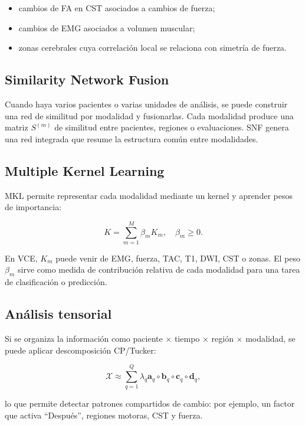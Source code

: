 \documentclass[conference]{IEEEtran}
\begin{document}
\begin{itemize}[leftmargin=*]
    \item cambios de FA en CST asociados a cambios de fuerza;
    \item cambios de EMG asociados a volumen muscular;
    \item zonas cerebrales cuya correlación local se relaciona con simetría de fuerza.
\end{itemize}

\subsection{Similarity Network Fusion}
Cuando haya varios pacientes o varias unidades de análisis, se puede construir una red de similitud por modalidad y fusionarlas. Cada modalidad produce una matriz $S^{(m)}$ de similitud entre pacientes, regiones o evaluaciones. SNF genera una red integrada que resume la estructura común entre modalidades.

\subsection{Multiple Kernel Learning}
MKL permite representar cada modalidad mediante un kernel y aprender pesos de importancia:

\begin{equation}
K = \sum_{m=1}^{M} \beta_m K_m, \quad \beta_m \geq 0.
\end{equation}

En VCE, $K_m$ puede venir de EMG, fuerza, TAC, T1, DWI, CST o zonas. El peso $\beta_m$ sirve como medida de contribución relativa de cada modalidad para una tarea de clasificación o predicción.

\subsection{Análisis tensorial}
Si se organiza la información como paciente $\times$ tiempo $\times$ región $\times$ modalidad, se puede aplicar descomposición CP/Tucker:

\begin{equation}
\mathcal{X} \approx \sum_{q=1}^{Q} \lambda_q \mathbf{a}_q \circ \mathbf{b}_q \circ \mathbf{c}_q \circ \mathbf{d}_q,
\end{equation}

lo que permite detectar patrones compartidos de cambio: por ejemplo, un factor que activa ``Después'', regiones motoras, CST y fuerza.
\end{document}
